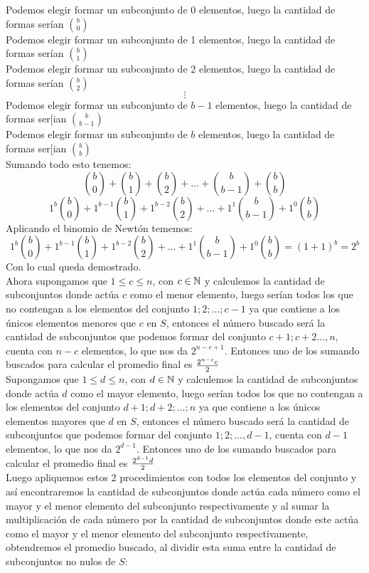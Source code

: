 \documentclass{book}
\begin{document}
\begin{enumerate}
          Podemos elegir formar un subconjunto de 0 elementos, luego la cantidad de formas serían  $\displaystyle{b \choose 0}$\\
          Podemos elegir formar un subconjunto de 1 elementos, luego la cantidad de formas serían  $\displaystyle{b \choose 1}$\\
          Podemos elegir formar un subconjunto de 2 elementos, luego la cantidad de formas serían  $\displaystyle{b \choose 2}$\\
          $$\vdots$$
          Podemos elegir formar un subconjunto de $b-1$ elementos, luego la cantidad de formas ser[ian  $\displaystyle{b \choose {b-1}}$\\
          Podemos elegir formar un subconjunto de $b$ elementos, luego la cantidad de formas ser[ian  $\displaystyle{b \choose b}$\\
          Sumando todo esto tenemos:
          $${b \choose 0}+{b \choose 1}+{b \choose 2}+\ldots +{b \choose {b-1}}+{b \choose b}$$
          $$1^b {b \choose 0}+1^{b-1} {b \choose 1}+1^{b-2} {b \choose 2}+\ldots +1^1 {b \choose {b-1}}+1^0 {b \choose b}$$
          Aplicando el binomio de Newtón tememos:
          $$1^b {b \choose 0}+1^{b-1} {b \choose 1}+1^{b-2} {b \choose 2}+\ldots +1^1 {b \choose {b-1}}+1^0 {b \choose b}={(1+1)}^b=2^b$$
          Con lo cual queda demostrado.\\
          Ahora supongamos que $1\leq c\leq n$, con $c\in \mathbb{N}$ y calculemos la cantidad de subconjuntos donde actúa $c$ como el menor elemento, luego serían todos los que no contengan a los elementos del conjunto ${1;2;\ldots;c-1}$ ya que contiene a los únicos elementos menores que $c$ en $S$, entonces el número buscado será la cantidad de subconjuntos que podemos formar del conjunto ${c+1;c+2\ldots ,n}$, cuenta con $n-c$ elementos, lo que nos da $2^{n-c+1}$. Entonces uno de los sumando buscados para calcular el promedio final es ${2^{n-c}c\over 2}$\\
          Supongamos que $1\leq d\leq n$, con $d\in \mathbb{N}$ y calculemos la cantidad de subconjuntos donde actúa $d$ como el mayor elemento, luego serían todos los que no contengan a los elementos del conjunto ${d+1;d+2;\ldots;n}$ ya que contiene a los únicos elementos mayores que $d$ en $S$, entonces el número buscado será la cantidad de subconjuntos que podemos formar del conjunto ${1;2;\ldots ,d-1}$, cuenta con $d-1$ elementos, lo que nos da $2^{d-1}$. Entonces uno de los sumando buscados para calcular el promedio final es ${2^{d-1}d\over 2}$\\
          Luego apliquemos estos 2 procedimientos con todos los elementos del conjunto y así encontraremos la cantidad de subconjuntos donde actúa cada número como el mayor y el menor elemento del subconjunto respectivamente y al sumar la multiplicación de cada número por la cantidad de subconjuntos donde este actúa como el mayor y el menor elemento del subconjunto respectivamente, obtendremos el promedio buscado, al dividir esta suma entre la cantidad de subconjuntos no nulos de $S$:

\end{enumerate}
\end{document}

